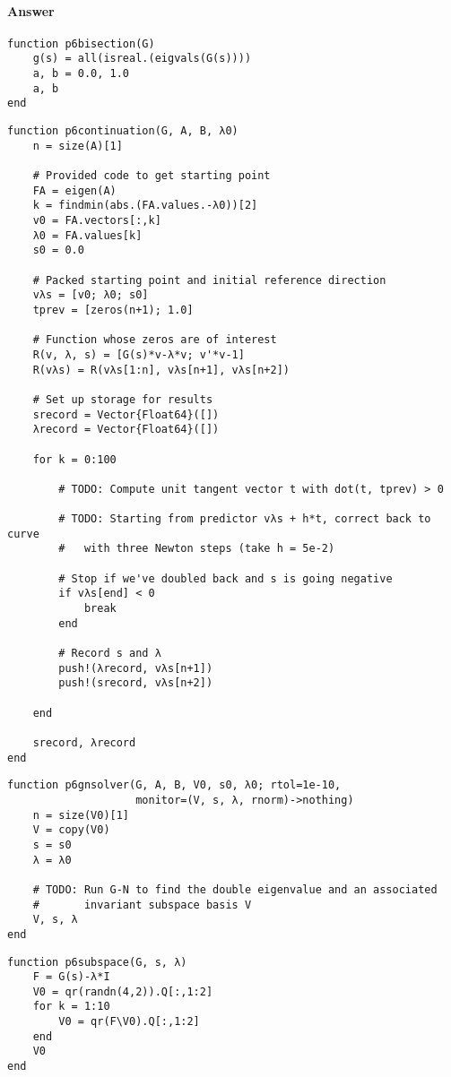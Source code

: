 \documentclass[12pt, leqno]{article} %
\begin{document}
\paragraph{Answer}


\begin{verbatim}
function p6bisection(G)
    g(s) = all(isreal.(eigvals(G(s))))
    a, b = 0.0, 1.0
    a, b
end
\end{verbatim}

\begin{verbatim}
function p6continuation(G, A, B, λ0)
    n = size(A)[1]
    
    # Provided code to get starting point
    FA = eigen(A)
    k = findmin(abs.(FA.values.-λ0))[2]
    v0 = FA.vectors[:,k]
    λ0 = FA.values[k]
    s0 = 0.0

    # Packed starting point and initial reference direction
    vλs = [v0; λ0; s0]
    tprev = [zeros(n+1); 1.0]

    # Function whose zeros are of interest
    R(v, λ, s) = [G(s)*v-λ*v; v'*v-1]
    R(vλs) = R(vλs[1:n], vλs[n+1], vλs[n+2])

    # Set up storage for results
    srecord = Vector{Float64}([])
    λrecord = Vector{Float64}([])
    
    for k = 0:100

        # TODO: Compute unit tangent vector t with dot(t, tprev) > 0

        # TODO: Starting from predictor vλs + h*t, correct back to curve
        #   with three Newton steps (take h = 5e-2)

        # Stop if we've doubled back and s is going negative
        if vλs[end] < 0
            break
        end
        
        # Record s and λ
        push!(λrecord, vλs[n+1])
        push!(srecord, vλs[n+2])

    end

    srecord, λrecord
end
\end{verbatim}

\begin{verbatim}
function p6gnsolver(G, A, B, V0, s0, λ0; rtol=1e-10,
                    monitor=(V, s, λ, rnorm)->nothing)
    n = size(V0)[1]
    V = copy(V0)
    s = s0
    λ = λ0

    # TODO: Run G-N to find the double eigenvalue and an associated
    #       invariant subspace basis V
    V, s, λ
end
\end{verbatim}

\begin{verbatim}
function p6subspace(G, s, λ)
    F = G(s)-λ*I
    V0 = qr(randn(4,2)).Q[:,1:2]
    for k = 1:10
        V0 = qr(F\V0).Q[:,1:2]
    end
    V0
end
\end{verbatim}
\end{document}
